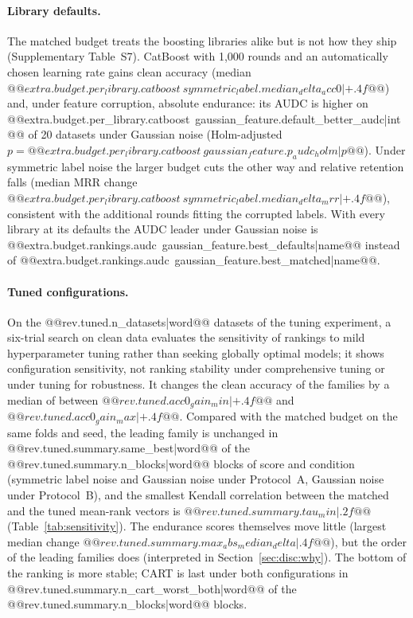 \documentclass[pdflatex,sn-mathphys]{sn-jnl}
\theoremstyle{thmstyleone}
\theoremstyle{thmstyletwo}
\theoremstyle{thmstylethree}
\begin{document}
\paragraph{Library defaults.} The matched budget treats the boosting libraries alike but is not how they ship (Supplementary Table~S7). CatBoost with 1{,}000 rounds and an automatically chosen learning rate gains clean accuracy (median $@@{extra.budget.per_library.catboost~symmetric_label.median_delta_acc0|+.4f}@@$) and, under feature corruption, absolute endurance: its AUDC is higher on @@{extra.budget.per_library.catboost~gaussian_feature.default_better_audc|int}@@ of 20 datasets under Gaussian noise (Holm-adjusted $p=@@{extra.budget.per_library.catboost~gaussian_feature.p_audc_holm|p}@@$). Under symmetric label noise the larger budget cuts the other way and relative retention falls (median MRR change $@@{extra.budget.per_library.catboost~symmetric_label.median_delta_mrr|+.4f}@@$), consistent with the additional rounds fitting the corrupted labels. With every library at its defaults the AUDC leader under Gaussian noise is @@{extra.budget.rankings.audc~gaussian_feature.best_defaults|name}@@ instead of @@{extra.budget.rankings.audc~gaussian_feature.best_matched|name}@@.

\paragraph{Tuned configurations.} On the @@{rev.tuned.n_datasets|word}@@ datasets of the tuning experiment, a six-trial search on clean data evaluates the sensitivity of rankings to mild hyperparameter tuning rather than seeking globally optimal models; it shows configuration sensitivity, not ranking stability under comprehensive tuning or under tuning for robustness. It changes the clean accuracy of the families by a median of between $@@{rev.tuned.acc0_gain_min|+.4f}@@$ and $@@{rev.tuned.acc0_gain_max|+.4f}@@$. Compared with the matched budget on the same folds and seed, the leading family is unchanged in @@{rev.tuned.summary.same_best|word}@@ of the @@{rev.tuned.summary.n_blocks|word}@@ blocks of score and condition (symmetric label noise and Gaussian noise under Protocol~A, Gaussian noise under Protocol~B), and the smallest Kendall correlation between the matched and the tuned mean-rank vectors is $@@{rev.tuned.summary.tau_min|.2f}@@$ (Table~\ref{tab:sensitivity}). The endurance scores themselves move little (largest median change $@@{rev.tuned.summary.max_abs_median_delta|.4f}@@$), but the order of the leading families does (interpreted in Section~\ref{sec:disc:why}). The bottom of the ranking is more stable; CART is last under both configurations in @@{rev.tuned.summary.n_cart_worst_both|word}@@ of the @@{rev.tuned.summary.n_blocks|word}@@ blocks.
\end{document}
